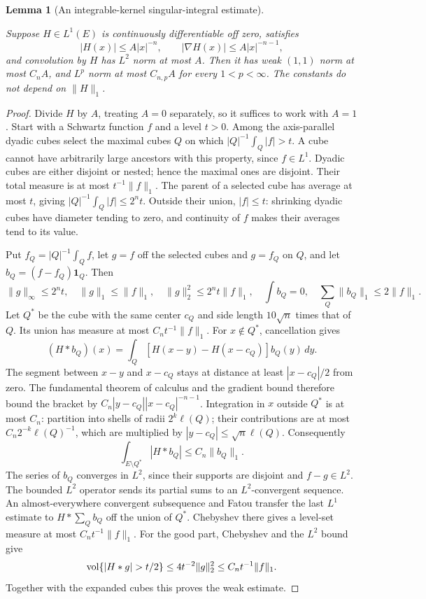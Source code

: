 \documentclass[11pt,oneside]{article}
\newtheorem{lemma}[theorem]{Lemma}
\theoremstyle{definition}\newtheorem{definition}[theorem]{Definition}
\theoremstyle{remark}\newtheorem{remark}[theorem]{Remark}
\newcommand{\ind}{\mathbf 1}\newcommand{\supp}{\operatorname{supp}}\newcommand{\dist}{\operatorname{dist}}
\newcommand{\bp}[1]{\leavevmode\par\nobreak\noindent{\normalfont\small\sffamily Blueprint identifier: \texttt{#1}.}\par\nobreak}
\begin{document}
\begin{lemma}[An integrable-kernel singular-integral estimate]\label{lem:cz}
\bp{cz\_from\_decomposition}
Suppose $H\in L^1(E)$ is continuously differentiable off zero, satisfies
\[
 |H(x)|\leq A|x|^{-n},\qquad |\nabla H(x)|\leq A|x|^{-n-1},
\]
and convolution by $H$ has $L^2$ norm at most $A$. Then it has weak $(1,1)$
norm at most $C_nA$, and $L^p$ norm at most $C_{n,p}A$ for every $1<p<\infty$.
The constants do not depend on $\|H\|_1$.
\end{lemma}
\begin{proof}
Divide $H$ by $A$, treating $A=0$ separately, so it suffices to work with
$A=1$. Start with a Schwartz function $f$ and a level $t>0$. Among the
axis-parallel dyadic cubes select the maximal cubes $Q$ on which
$|Q|^{-1}\int_Q|f|>t$. A cube cannot have arbitrarily large ancestors with
this property, since $f\in L^1$. Dyadic cubes are either disjoint or nested;
hence the maximal ones are disjoint. Their total measure is at most
$t^{-1}\|f\|_1$. The parent of a selected cube has average at most $t$, giving
$|Q|^{-1}\int_Q|f|\leq2^nt$. Outside their union, $|f|\leq t$: shrinking
dyadic cubes have diameter tending to zero, and continuity of $f$ makes their
averages tend to its value.

Put $f_Q=|Q|^{-1}\int_Qf$, let $g=f$ off the selected cubes and $g=f_Q$ on
$Q$, and let $b_Q=(f-f_Q)\ind_Q$. Then
\[
 \|g\|_\infty\leq2^nt,\quad \|g\|_1\leq\|f\|_1,\quad
 \|g\|_2^2\leq2^nt\|f\|_1,\quad
 \int b_Q=0,\quad\sum_Q\|b_Q\|_1\leq2\|f\|_1.
\]
Let $Q^*$ be the cube with the same center $c_Q$ and side length
$10\sqrt n$ times that of $Q$. Its union has measure at most
$C_nt^{-1}\|f\|_1$. For $x\notin Q^*$, cancellation gives
\[
 (H*b_Q)(x)=\int_Q[H(x-y)-H(x-c_Q)]b_Q(y)\,dy.
\]
The segment between $x-y$ and $x-c_Q$ stays at distance at least
$|x-c_Q|/2$ from zero. The fundamental theorem of calculus and the gradient
bound therefore bound the bracket by
$C_n|y-c_Q||x-c_Q|^{-n-1}$. Integration in $x$ outside $Q^*$ is at most
$C_n$: partition into shells of radii $2^k\ell(Q)$; their contributions are
at most $C_n2^{-k}\ell(Q)^{-1}$, which are multiplied by
$|y-c_Q|\leq\sqrt n\ell(Q)$. Consequently
\[
 \int_{E\setminus Q^*}|H*b_Q|\leq C_n\|b_Q\|_1.
\]
The series of $b_Q$ converges in $L^2$, since their supports are disjoint and
$f-g\in L^2$. The bounded $L^2$ operator sends its partial sums to an
$L^2$-convergent sequence. An almost-everywhere convergent subsequence and
Fatou transfer the last $L^1$ estimate to $H*\sum_Qb_Q$ off the union of
$Q^*$. Chebyshev there gives a level-set measure at most
$C_nt^{-1}\|f\|_1$. For the good part, Chebyshev and the $L^2$ bound give
\[
 \vol\{|H*g|>t/2\}\leq4t^{-2}\|g\|_2^2
       \leq C_nt^{-1}\|f\|_1.
\]
Together with the expanded cubes this proves the weak estimate.


\end{proof}
\end{document}
